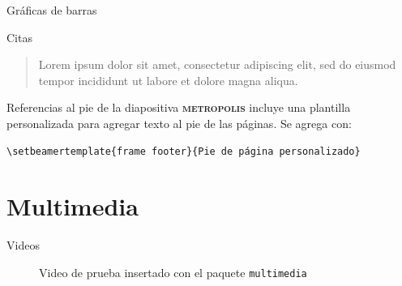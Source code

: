 \documentclass[10pt]{beamer}
\newcommand{\themename}{\textbf{\textsc{metropolis}}\xspace}
\begin{document}
\begin{frame}{Gráficas de barras}
  \begin{figure}
  \end{figure}
\end{frame}
\begin{frame}{Citas}
  \begin{quote}
    Lorem ipsum dolor sit amet, consectetur adipiscing elit, sed do eiusmod tempor incididunt ut labore et dolore magna aliqua.
  \end{quote}
\end{frame}

{%
\begin{frame}[fragile]{Referencias al pie de la diapositiva}
    \themename incluye una plantilla personalizada para agregar texto al pie de las páginas. Se agrega con:
    \begin{verbatim}\setbeamertemplate{frame footer}{Pie de página personalizado}\end{verbatim}
\end{frame}
}

\section{Multimedia}
\begin{frame}{Videos}
\begin{figure}[h!]
\centering
{}
  \caption{Video de prueba insertado con el paquete \texttt{multimedia}}
 \end{figure}
\end{frame}
\end{document}
